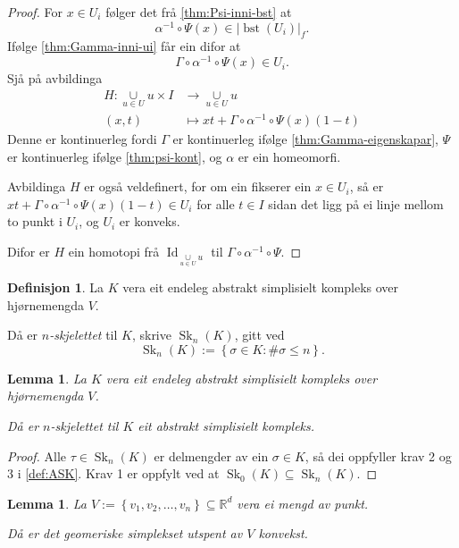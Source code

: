 \documentclass[a4paper, 12pt, norsk]{article}
\theoremstyle{plain}
\newtheorem{lemma}[theorem]{Lemma}
\theoremstyle{definition}
\newtheorem{definition}[theorem]{Definisjon}
\newcommand{\Rb}{\mathbb{R}}
\newcommand{\union}{ \mathop{\cup}\limits }
\newcommand{\gr}[1]{ \lvert #1 \rvert } %
\newcommand{\set}[1]{ \left\{ #1 \right\} } %
\newcommand{\tuple}[1]{ \left( #1 \right) } %
\DeclareMathOperator{\bst}{bst} %
\DeclareMathOperator{\Sk}{Sk} %
\DeclareMathOperator{\Id}{Id} %
\begin{document}
\begin{proof}
	For \( x \in U_i \) følger det frå \autoref{thm:Psi-inni-bst} at
	\[
		\alpha^{-1} \circ \Psi(x) \in \gr{\bst(U_i)}_f.
	\]
	Ifølge \autoref{thm:Gamma-inni-ui} får ein difor at
	\[
		\Gamma \circ \alpha^{-1} \circ \Psi(x) \in U_i.
	\]
	Sjå på avbildinga
	\begin{align*}
		H: \union_{u \in U} u \times I &\to \union_{u \in U} u \\
		\tuple{x, t} &\mapsto xt + \Gamma \circ \alpha^{-1} \circ \Psi(x)(1-t)
	\end{align*}
	Denne er kontinuerleg fordi \( \Gamma \) er kontinuerleg ifølge \autoref{thm:Gamma-eigenskapar}, \( \Psi \) er kontinuerleg ifølge \autoref{thm:psi-kont}, og \( \alpha \) er ein homeomorfi.
	
	Avbildinga \( H \) er også veldefinert, for om ein fikserer ein \( x \in U_i \), så er \( xt + \Gamma \circ \alpha^{-1} \circ \Psi(x)(1-t) \in U_i \) for alle \( t \in I \) sidan det ligg på ei linje mellom to punkt i \( U_i \), og \( U_i \) er konveks.

	Difor er \( H \) ein homotopi frå \( \Id_{\union_{u \in U} u} \) til \( \Gamma \circ \alpha^{-1} \circ \Psi \).
\end{proof}

\begin{definition}
	La \( K \) vera eit endeleg abstrakt simplisielt kompleks over hjørnemengda \( V \). 
	
	Då er \emph{\( n \)-skjelettet} til \( K \), skrive \( \Sk_n(K) \), gitt ved
	\[
		\Sk_n(K) := \set{\sigma \in K : \#\sigma \leq n}.
	\]
\end{definition}

\begin{lemma}
	La \( K \) vera eit endeleg abstrakt simplisielt kompleks over hjørnemengda \( V \). 
	
	Då er \( n \)-skjelettet til \( K \) eit abstrakt simplisielt kompleks.
\end{lemma}

\begin{proof}
	Alle \( \tau \in \Sk_n(K) \) er delmengder av ein \( \sigma \in K \), så dei oppfyller krav 2 og 3 i \autoref{def:ASK}. Krav 1 er oppfylt ved at \( \Sk_0(K) \subseteq \Sk_n(K) \).
\end{proof}

\begin{lemma} \label{thm:konveks-kombinasjon-er-konveks}
	La \( V := \set{v_1, v_2, \dots, v_n} \subseteq \Rb^d \) vera ei mengd av punkt.
	
	Då er det geomeriske simplekset utspent av \( V \) konvekst.
\end{lemma}
\end{document}
